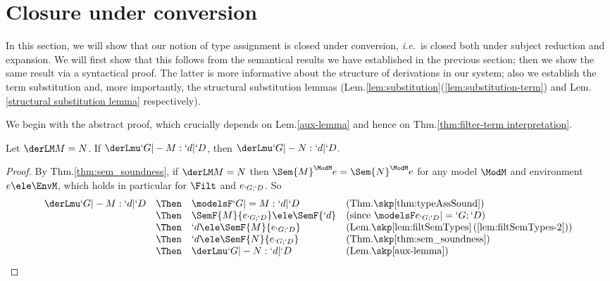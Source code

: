 \documentclass{lmcs}
\def\ie{\emph{i.e.}}
\begin{document}
 \section{Closure under conversion} \label{sec:closureUnderConv} 

In this section, we will show that our notion of type assignment is closed under conversion, \ie~is closed both under subject reduction and expansion.
We will first show that this follows from the semantical results we have established in the previous section; then we show the same result via a syntactical proof. 
The latter is more informative about the structure of derivations in our system; also we establish the term substitution and, more importantly, the structural substitution lemmas (Lem.\skp\ref{lem:substitution}\skp(\ref{lem:substitution-term}) and Lem.\skp\ref{structural substitution lemma} respectively).

We begin with the abstract proof, which crucially depends on Lem.\skp\ref{aux-lemma} and hence on Thm.\skp\ref{thm:filter-term interpretation}.

 \begin{thm} \label{thm:convInvariance}
Let $ \derLM M = N $. If $ \derLmu `G |- M : `d | `D $, then $ \derLmu `G |- N : `d | `D $.
 \end{thm}

 \begin{proof}
By Thm.\skp\ref{thm:sem_soundness}, if $\derLM M = N $ then $\Sem{ M }^{\ModM}{ e } = \Sem{ N }^{\ModM}{ e }$ for any 
model ${\ModM}$ and environment $e \ele \EnvM$, which holds in particular for $\Filt$ and $ e_{`G;`D }$. So 
%
 \[ \begin{array}[t]{rcl@{\quad}l}
 \derLmu `G |- M : `d | `D 
	& \Then &
 \modelsF `G |= M : `d | `D & (\textrm{Thm.\skp\ref{thm:typeAssSound}})
	\\ & \Then &
	\SemF { M }{ e_{`G;`D } } \ele \SemF {`d} & (\textrm{since } \modelsF e_{`G;`D } |= `G;`D )
	\\ & \Then &
`d \ele \SemF { M }{ e_{`G;`D } } & (\textrm{Lem.\skp\ref{lem:filtSemTypes}\,(\ref{lem:filtSemTypes-2})})
	\\ & \Then &
`d \ele \SemF {N}{ e_{`G;`D } } & (\textrm{Thm.\skp\ref{thm:sem_soundness}})
	\\ & \Then &
 \derLmu `G |- N : `d | `D & (\textrm{Lem.\skp\ref{aux-lemma}})
 \end{array} \]
\arrayqed[-22pt]
 \end{proof}
\end{document}
